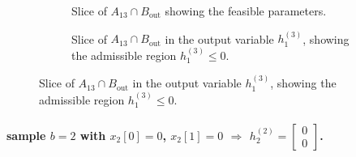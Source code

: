 \begin{figure}[h]
\vspace{0.5em}
\centering
\begin{subfigure}[t]{0.48\textwidth}
\centering

\caption{Slice of $A_{13}  \cap B_{\mathrm{out}}$ showing the feasible parameters.}
\label{fig:xor_output_relation_w1_wb}
\end{subfigure}
\hfill
\begin{subfigure}[t]{0.48\textwidth}
\centering

\caption{Slice of $A_{13}  \cap B_{\mathrm{out}}$ in the output variable $h_1^{(3)}$, showing the
admissible region $h_1^{(3)} \le 0$.}
\label{fig:xor_neg_y}
\end{subfigure}
\label{fig:xor_output_relation}
\end{figure}
\paragraph{sample $b=2$ with $x_2[0]=0$, $x_2[1]=0$ $\Rightarrow$
$h_2^{(2)} =\begin{bmatrix} 0 \\ 0 \end{bmatrix}$.}

